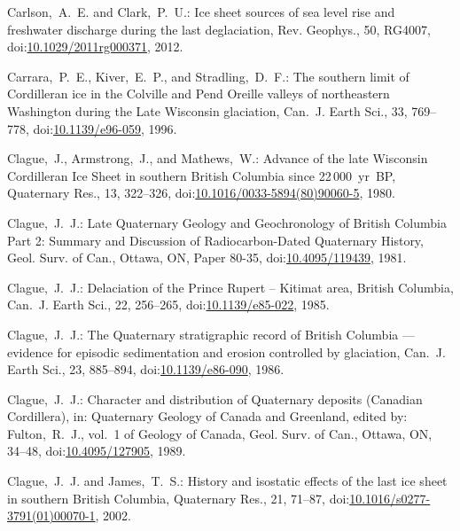 \documentclass[tc, manuscript]{copernicus}
\begin{document}
\begin{thebibliography}{114}
Carlson,~A.~E. and Clark,~P.~U.: Ice sheet sources of sea level rise and
freshwater discharge during the last deglaciation, Rev. Geophys., 50, RG4007,
doi:\href{http://dx.doi.org/10.1029/2011rg000371}{10.1029/2011rg000371},
2012.


Carrara,~P.~E., Kiver,~E.~P., and Stradling,~D.~F.: The southern limit of Cordilleran ice in the Colville and Pend Oreille valleys of northeastern Washington during the Late Wisconsin glaciation, Can.~J. Earth Sci., 33, 769--778,
doi:\href{http://dx.doi.org/10.1139/e96-059}{10.1139/e96-059}, 1996.


Clague,~J., Armstrong,~J., and Mathews,~W.: Advance of the late Wisconsin Cordilleran Ice Sheet in southern British Columbia since 22\,000~yr~BP, Quaternary Res., 13, 322--326,
doi:\href{http://dx.doi.org/10.1016/0033-5894(80)90060-5}{10.1016/0033-5894(80)90060-5}, 1980.


Clague,~J.~J.: Late Quaternary Geology and Geochronology of British Columbia Part 2: Summary and Discussion of Radiocarbon-Dated Quaternary History, Geol. Surv. of Can., Ottawa, ON, Paper 80-35,
doi:\href{http://dx.doi.org/10.4095/119439}{10.4095/119439}, 1981.


Clague,~J.~J.: Delaciation of the Prince Rupert -- Kitimat area, British Columbia, Can.~J. Earth Sci., 22, 256--265,
doi:\href{http://dx.doi.org/10.1139/e85-022}{10.1139/e85-022}, 1985.


Clague,~J.~J.: The Quaternary stratigraphic record of British Columbia --- evidence for episodic sedimentation and erosion controlled by glaciation, Can.~J. Earth Sci., 23, 885--894,
doi:\href{http://dx.doi.org/10.1139/e86-090}{10.1139/e86-090}, 1986.


Clague,~J.~J.: Character and distribution of Quaternary deposits (Canadian Cordillera), in: Quaternary Geology of Canada and Greenland, edited by: Fulton,~R.~J., vol.~1 of Geology of Canada, Geol. Surv. of Can., Ottawa, ON, 34--48,
doi:\href{http://dx.doi.org/10.4095/127905}{10.4095/127905}, 1989.


Clague,~J.~J. and James,~T.~S.: History and isostatic effects of the last ice sheet in southern British Columbia, Quaternary Res., 21, 71--87,
doi:\href{http://dx.doi.org/10.1016/s0277-3791(01)00070-1}{10.1016/s0277-3791(01)00070-1}, 2002.



\end{thebibliography}
\end{document}
